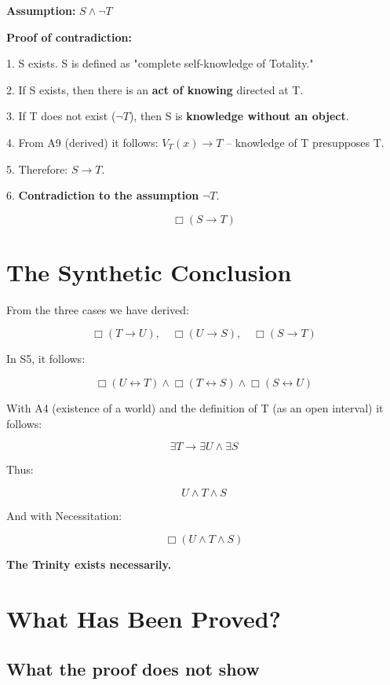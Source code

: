 \documentclass[
]{article}
\begin{document}
\textbf{Assumption:} \(S \land \neg T\)

\textbf{Proof of contradiction:}

1. S exists. S is defined as "complete self-knowledge of Totality."

2. If S exists, then there is an \textbf{act of knowing} directed at T.

3. If T does not exist (\(\neg T\)), then S is \textbf{knowledge without an object}.

4. From A9 (derived) it follows: \(V_T(x) \rightarrow T\) – knowledge of T presupposes T.

5. Therefore: \(S \rightarrow T\).

6. \textbf{Contradiction to the assumption} \(\neg T\).

\[
\boxed{\Box(S \rightarrow T)}
\]

\section{The Synthetic Conclusion}\label{the-synthetic-conclusion}

From the three cases we have derived:

\[
\Box(T \rightarrow U), \quad \Box(U \rightarrow S), \quad \Box(S \rightarrow T)
\]

In S5, it follows:

\[
\Box(U \leftrightarrow T) \land \Box(T \leftrightarrow S) \land \Box(S \leftrightarrow U)
\]

With A4 (existence of a world) and the definition of T (as an open interval) it follows:

\[
\exists T \rightarrow \exists U \land \exists S
\]

Thus:

\[
\boxed{U \land T \land S}
\]

And with Necessitation:

\[
\boxed{\Box(U \land T \land S)}
\]

\textbf{The Trinity exists necessarily.}

\section{What Has Been Proved?}\label{what-has-been-proved}

\subsection{What the proof does not show}\label{what-the-proof-does-not-show}
\end{document}

